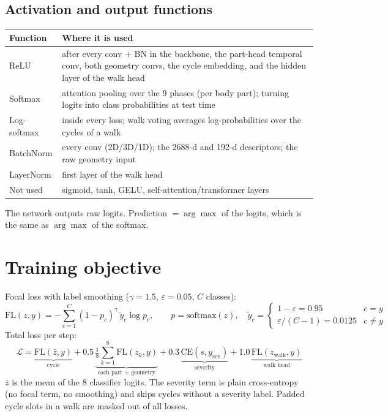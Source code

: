 \documentclass[10pt,a4paper]{article}
\begin{document}
\subsection{Activation and output functions}
\begin{center}
\begin{tabularx}{\textwidth}{@{}lL@{}}
\toprule
Function & Where it is used \\
\midrule
ReLU & after every conv + BN in the backbone, the part-head temporal conv, both geometry convs,
  the cycle embedding, and the hidden layer of the walk head \\
Softmax & attention pooling over the 9 phases (per body part); turning logits into class
  probabilities at test time \\
Log-softmax & inside every loss; walk voting averages log-probabilities over the cycles of a walk \\
BatchNorm & every conv (2D/3D/1D); the 2688-d and 192-d descriptors; the raw geometry input \\
LayerNorm & first layer of the walk head \\
Not used & sigmoid, tanh, GELU, self-attention/transformer layers \\
\bottomrule
\end{tabularx}
\end{center}
The network outputs raw logits. Prediction $= \arg\max$ of the logits, which is the same
as $\arg\max$ of the softmax.

\section{Training objective}
Focal loss with label smoothing ($\gamma = 1.5$, $\varepsilon = 0.05$, $C$ classes):
\[
\mathrm{FL}(z, y) = -\sum_{c=1}^{C} (1 - p_c)^{\gamma}\, \tilde y_c \log p_c,\qquad
p = \mathrm{softmax}(z),\quad
\tilde y_c = \begin{cases} 1-\varepsilon = 0.95 & c = y\\ \varepsilon/(C-1) = 0.0125 & c \ne y\end{cases}
\]
Total loss per step:
\[
\mathcal{L} = \underbrace{\mathrm{FL}(\bar z, y)}_{\text{cycle}}
+ 0.5\,\underbrace{\tfrac{1}{8}\textstyle\sum_{k=1}^{8}\mathrm{FL}(z_k, y)}_{\text{each part + geometry}}
+ 0.3\,\underbrace{\mathrm{CE}(s, y_{\text{sev}})}_{\text{severity}}
+ 1.0\,\underbrace{\mathrm{FL}(z_{\text{walk}}, y)}_{\text{walk head}}
\]
$\bar z$ is the mean of the 8 classifier logits. The severity term is plain cross-entropy
(no focal term, no smoothing) and skips cycles without a severity label. Padded cycle slots
in a walk are masked out of all losses.
\end{document}
